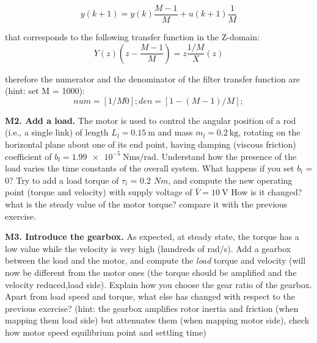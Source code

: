 \documentclass[11pt]{article}
\begin{document}
\begin{equation}
y(k+1) = y(k)\frac{M-1}{M} + u(k+1)\frac{1}{M}
\end{equation}

that corresponds to the following transfer function in the Z-domain:
\begin{equation}
Y(z)(z - \frac{M-1}{M} ) = z \frac{1/M} X(z)
\end{equation}

therefore the numerator and the denominator of the filter transfer function are (hint: set M = 1000):
\begin{equation}
num = [1/M 0];
den = [1 -(M-1)/M];
\end{equation}

\textbf{M2. Add a load.} The motor is used to control the angular position of a rod (i.e., a single link) 
of length $L_l = 0.15 \ \mathrm{m}$ and mass $m_l = 0.2 \ \mathrm{kg}$, 
rotating on the horizontal plane about one of its end point, having damping (viscous friction) 
coefficient of $b_l = \num{1.99e-5} \ \mathrm{Nms/rad}$. 
Understand how the presence of the load varies the time constants of the overall system. 
What happens if you set $b_l$ = 0?  %
Try to add a load torque of $\tau_l$ = 0.2 $Nm$, and compute the new operating point (torque and velocity) with  supply voltage of $\bar{V} = 10 \ \mathrm{V}$ How is it changed? what is the steady value of the motor torque? compare it with the previous exercise.

%
\par
\textbf{M3. Introduce the gearbox.} As expected, at steady state, the torque has a low value while the velocity is very high (hundreds of rad/s). 
Add a gearbox between the load and the motor, and compute the \textit{load} torque and velocity (will now be different from the motor ones (the torque should be amplified  and the velocity reduced,load side). Explain how you choose the gear ratio of the gearbox.
Apart from load speed and torque, what else has changed with respect to the previous exercise? (hint: the gearbox amplifies rotor inertia and friction (when mapping them load side) but attenuates them (when mapping motor side), check how motor speed equilibrium point and settling time)
\end{document}
